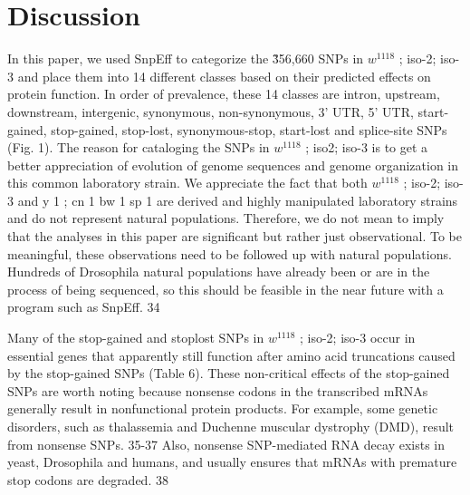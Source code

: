 \section{Discussion}

In this paper, we used SnpEff to categorize the \~356,660 SNPs in $w^{1118}$ ; iso-2; iso-3 and place them into 14 different classes based on their predicted effects on protein function. In order of prevalence, these 14 classes are intron, upstream, downstream, intergenic, synonymous, non-synonymous, 3' UTR, 5' UTR, start-gained, stop-gained, stop-lost, synonymous-stop, start-lost and splice-site SNPs (Fig. 1). The reason for cataloging the SNPs in $w^{1118}$ ; iso2; iso-3 is to get a better appreciation of evolution of genome sequences and genome organization in this common laboratory strain. We appreciate the fact that both $w^{1118}$ ; iso-2; iso-3 and y 1 ; cn 1 bw 1 sp 1 are derived and highly manipulated laboratory strains and do not represent natural populations. Therefore, we do not mean to imply that the analyses in this paper are significant but rather just observational. To be meaningful, these observations need to be followed up with natural populations. Hundreds of Drosophila natural populations have already been or are in the process of being sequenced, so this should be feasible in the near future with a program such as SnpEff. 34

Many of the stop-gained and stoplost SNPs in $w^{1118}$ ; iso-2; iso-3 occur in essential genes that apparently still function after amino acid truncations caused by the stop-gained SNPs (Table 6). These non-critical effects of the stop-gained SNPs are worth noting because nonsense codons in the transcribed mRNAs generally result in nonfunctional protein products. For example, some genetic disorders, such as thalassemia and Duchenne muscular dystrophy (DMD), result from nonsense SNPs. 35-37 Also, nonsense SNP-mediated RNA decay exists in yeast, Drosophila and humans, and usually ensures that mRNAs with premature stop codons are degraded. 38

